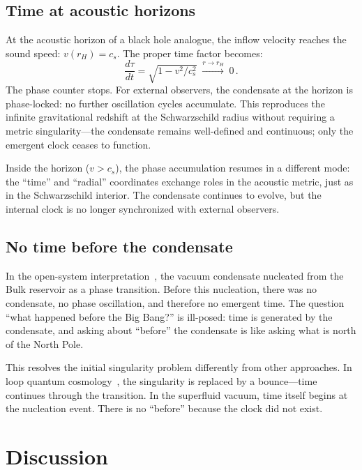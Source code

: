 \documentclass[12pt, a4paper]{article}
\begin{document}
\subsection{Time at acoustic horizons}

At the acoustic horizon of a black hole analogue,
the inflow velocity reaches the sound speed:
$v(r_H) = c_s$. The proper time factor becomes:
\begin{equation}
    \frac{d\tau}{dt}
    = \sqrt{1 - v^2/c_s^2}
    \;\xrightarrow{r \to r_H}\; 0\,.
\end{equation}
The phase counter stops. For external observers,
the condensate at the horizon is phase-locked: no
further oscillation cycles accumulate. This
reproduces the infinite gravitational redshift at
the Schwarzschild radius without requiring a
metric singularity---the condensate remains
well-defined and continuous; only the emergent
clock ceases to function.

Inside the horizon ($v > c_s$), the phase
accumulation resumes in a different mode: the
``time'' and ``radial'' coordinates exchange roles
in the acoustic metric, just as in the
Schwarzschild interior. The condensate continues
to evolve, but the internal clock is no longer
synchronized with external observers.

\subsection{No time before the condensate}

In the open-system
interpretation~\cite{kulangiev_2026c}, the vacuum
condensate nucleated from the Bulk reservoir as a
phase transition. Before this nucleation, there was
no condensate, no phase oscillation, and therefore
no emergent time. The question ``what happened
before the Big Bang?'' is ill-posed: time is
generated by the condensate, and asking about
``before'' the condensate is like asking what is
north of the North Pole.

This resolves the initial singularity problem
differently from other approaches. In loop quantum
cosmology~\cite{bojowald_2001}, the singularity is
replaced by a bounce---time continues through the
transition. In the superfluid vacuum, time itself
begins at the nucleation event. There is no
``before'' because the clock did not exist.


\section{Discussion}
\label{sec:discussion}
\end{document}
